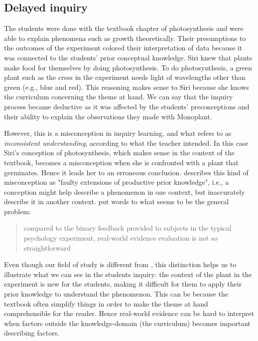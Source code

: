 \subsection{Delayed inquiry}
The students were done with the textbook chapter of photosynthesis and were able to explain  phenomena such as growth theoretically. Their presumptions to the outcomes of the experiment colored their interpretation of data because it was connected to the students' prior conceptual knowledge. Siri knew that plants make food for themselves by doing photosynthesis. To do photosynthesis, a green plant such as the cress in the experiment needs light of wavelengths other than green (e.g., blue and red). This reasoning makes sense to Siri because she knows the curriculum concerning the theme at hand. We can say that the inquiry process became deductive as it was affected by the students' preconceptions and their ability to explain the observations they made with Monoplant. 

However, this is a misconception in inquiry learning, and what \citet{gomez2008elementary} refers to as \emph{inconsistent understanding}, according to what the teacher intended. In this case Siri's conception of photosynthesis, which makes sense in the context of the textbook, becomes a misconception when she is confronted with a plant that germinates. Hence it leads her to an erroneous conclusion. \citet{smith1994misconceptions} describes this kind of misconception as "faulty extensions of productive prior knowledge", i.e., a conception might help describe a phenomenon in one context, but inaccurately describe it in another context. \citeauthor*{klahr1993heuristics} put words to what seems to be the general problem: 

\begin{quote}compared to the binary feedback provided to subjects in the typical psychology experiment, real-world evidence evaluation is not so straightforward \citetext{\citet[p. 114]{klahr1993heuristics}, referenced in \citealp{de1998scientific}}
\end{quote}

Even though our field of study is different from \citeauthor{klahr1993heuristics}, this distinction helps us to illustrate what we can see in the students inquiry: the context of the plant in the experiment is new for the students, making it difficult for them to apply their prior knowledge to understand the phenomenon. This can be because the textbook often simplify things in order to make the theme at hand comprehensible for the reader. Hence real-world evidence can be hard to interpret when factors outside the knowledge-domain (the curriculum) becomes important describing factors.

